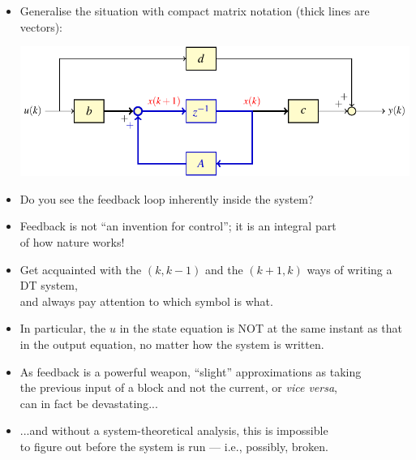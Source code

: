 \begin{frame}
\myPause
 \begin{itemize}[<+-| alert@+>]
 \item Generalise the situation with compact matrix notation (thick lines are vectors):
       \begin{center}
        \includegraphics[width=0.65\columnwidth]{./Unit-03/img/PS01-ex02-takeaway-FBscheme.pdf}
       \end{center}
 \item Do you see the \textcolor{blue!80!black}{feedback loop} inherently inside the system?
 \item Feedback is not ``an invention for control''; it is an integral part\\
       of how nature works!
 \end{itemize}
\end{frame}

\begin{frame}
\myPause
 \begin{itemize}[<+-| alert@+>]
 \item Get acquainted with the $(k,k-1)$ and the $(k+1,k)$ ways of writing a DT system,\\
       and always pay attention to which symbol is what.
 \item In particular, the $u$ in the state equation is NOT at the same instant as that\\
       in the output equation, no matter how the system is written.
 \item \vspace{4mm}As feedback is a powerful weapon, ``slight'' approximations as taking\\
       the previous input of a block and not the current, or \emph{vice versa},\\
       can in fact be devastating...
 \item ...and without a system-theoretical analysis, this is impossible\\
       to figure out before the system is run --- i.e., possibly, broken.
 \end{itemize}
\end{frame}



